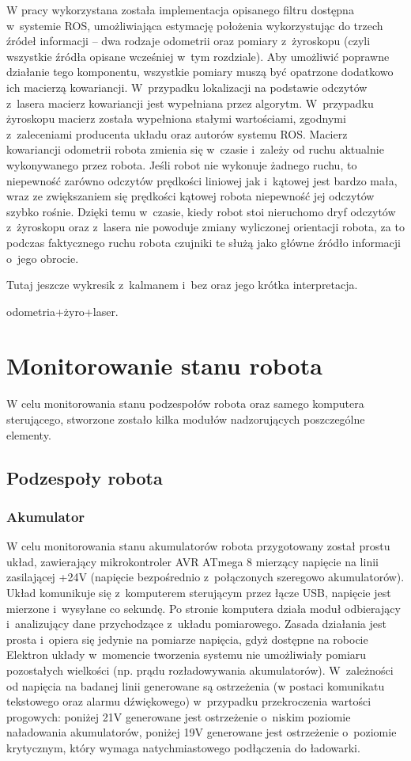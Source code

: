 W pracy wykorzystana została implementacja opisanego filtru dostępna w~systemie ROS,
umożliwiająca estymację położenia wykorzystując do trzech źródeł informacji -- dwa rodzaje
odometrii oraz pomiary z~żyroskopu (czyli wszystkie źródła opisane wcześniej w~tym rozdziale).
Aby umożliwić poprawne działanie tego komponentu, wszystkie pomiary muszą być opatrzone
dodatkowo ich macierzą kowariancji. W~przypadku lokalizacji na podstawie odczytów z~lasera
macierz kowariancji jest wypełniana przez algorytm. W~przypadku żyroskopu macierz
została wypełniona stałymi wartościami, zgodnymi z~zaleceniami producenta układu oraz
autorów systemu ROS. Macierz kowariancji odometrii robota zmienia się w~czasie i~zależy
od ruchu aktualnie wykonywanego przez robota. Jeśli robot nie wykonuje żadnego ruchu,
to niepewność zarówno odczytów prędkości liniowej jak i~kątowej jest bardzo mała,
wraz ze zwiększaniem się prędkości kątowej robota niepewność jej odczytów szybko rośnie.
Dzięki temu w~czasie, kiedy robot stoi nieruchomo dryf odczytów z~żyroskopu oraz z~lasera
nie powoduje zmiany wyliczonej orientacji robota, za to podczas faktycznego ruchu robota
czujniki te służą jako główne źródło informacji o~jego obrocie.

Tutaj jeszcze wykresik z~kalmanem i~bez oraz jego krótka interpretacja.

odometria+żyro+laser.

\section{Monitorowanie stanu robota}

W celu monitorowania stanu podzespołów robota oraz samego komputera sterującego,
stworzone zostało kilka modułów nadzorujących poszczególne elementy.

\subsection{Podzespoły robota}

\subsubsection{Akumulator}

W celu monitorowania stanu akumulatorów robota przygotowany został prostu układ,
zawierający mikrokontroler AVR ATmega 8 mierzący napięcie na linii
zasilającej +24V (napięcie bezpośrednio z~połączonych szeregowo akumulatorów).
Układ komunikuje się z~komputerem sterującym przez łącze USB, napięcie jest
mierzone i~wysyłane co sekundę. Po stronie komputera działa moduł odbierający 
i~analizujący dane przychodzące z~układu pomiarowego. Zasada działania jest prosta
i~opiera się jedynie na pomiarze napięcia, gdyż dostępne na robocie Elektron
układy w~momencie tworzenia systemu nie umożliwiały pomiaru pozostałych
wielkości (np. prądu rozładowywania akumulatorów). W~zależności od napięcia na
badanej linii generowane są ostrzeżenia (w postaci komunikatu tekstowego oraz
alarmu dźwiękowego) w~przypadku przekroczenia wartości progowych: poniżej 21V
generowane jest ostrzeżenie o~niskim poziomie naładowania akumulatorów, poniżej
19V generowane jest ostrzeżenie o~poziomie krytycznym, który wymaga
natychmiastowego podłączenia do ładowarki.

